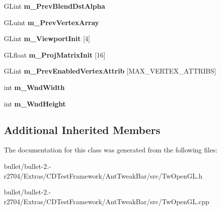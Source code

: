 \begin{DoxyCompactItemize}
\item 
\hypertarget{class_c_tw_graph_open_g_l_a0be2d3efdef88d3d104bc205ca21ebf4}{G\+Lint {\bfseries m\+\_\+\+Prev\+Blend\+Dst\+Alpha}}\label{class_c_tw_graph_open_g_l_a0be2d3efdef88d3d104bc205ca21ebf4}

\item 
\hypertarget{class_c_tw_graph_open_g_l_ad769fade2b4f37517684e0914f603274}{G\+Luint {\bfseries m\+\_\+\+Prev\+Vertex\+Array}}\label{class_c_tw_graph_open_g_l_ad769fade2b4f37517684e0914f603274}

\item 
\hypertarget{class_c_tw_graph_open_g_l_a6937624ba924cf911e9658e5815216b4}{G\+Lint {\bfseries m\+\_\+\+Viewport\+Init} \mbox{[}4\mbox{]}}\label{class_c_tw_graph_open_g_l_a6937624ba924cf911e9658e5815216b4}

\item 
\hypertarget{class_c_tw_graph_open_g_l_a38af7de06cd5683ff380446285eb0e16}{G\+Lfloat {\bfseries m\+\_\+\+Proj\+Matrix\+Init} \mbox{[}16\mbox{]}}\label{class_c_tw_graph_open_g_l_a38af7de06cd5683ff380446285eb0e16}

\item 
\hypertarget{class_c_tw_graph_open_g_l_a34c6ae15232374601089529a0c1147df}{G\+Lint {\bfseries m\+\_\+\+Prev\+Enabled\+Vertex\+Attrib} \mbox{[}M\+A\+X\+\_\+\+V\+E\+R\+T\+E\+X\+\_\+\+A\+T\+T\+R\+I\+B\+S\mbox{]}}\label{class_c_tw_graph_open_g_l_a34c6ae15232374601089529a0c1147df}

\item 
\hypertarget{class_c_tw_graph_open_g_l_ae360a29c3b30542a0089f4e13aec3075}{int {\bfseries m\+\_\+\+Wnd\+Width}}\label{class_c_tw_graph_open_g_l_ae360a29c3b30542a0089f4e13aec3075}

\item 
\hypertarget{class_c_tw_graph_open_g_l_acddb5546d4ee9608389afce956a4b15a}{int {\bfseries m\+\_\+\+Wnd\+Height}}\label{class_c_tw_graph_open_g_l_acddb5546d4ee9608389afce956a4b15a}

\end{DoxyCompactItemize}
\subsection*{Additional Inherited Members}


The documentation for this class was generated from the following files\+:\begin{DoxyCompactItemize}
\item 
bullet/bullet-\/2.-\/r2704/\+Extras/\+C\+D\+Test\+Framework/\+Ant\+Tweak\+Bar/src/Tw\+Open\+G\+L.\+h\item 
bullet/bullet-\/2.-\/r2704/\+Extras/\+C\+D\+Test\+Framework/\+Ant\+Tweak\+Bar/src/Tw\+Open\+G\+L.\+cpp\end{DoxyCompactItemize}
